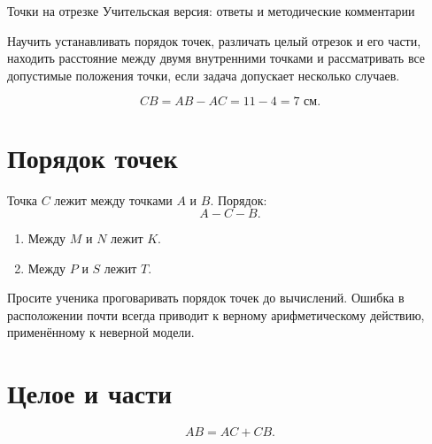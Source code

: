 
\worksheettitle
  {Точки на отрезке}
  {Учительская версия: ответы и методические комментарии}

\begin{teacherbox}
  Научить устанавливать порядок точек, различать целый отрезок и его части,
  находить расстояние между двумя внутренними точками и рассматривать все
  допустимые положения точки, если задача допускает несколько случаев.
\end{teacherbox}

\begin{checkpointbox}
  \[
    CB=AB-AC=11-4=7\text{ см}.
  \]
\end{checkpointbox}

\section{Порядок точек}

\betweenfigure

\begin{propertybox}[Ответ]
  Точка \(C\) лежит между точками \(A\) и \(B\). Порядок:
  \[
    A-C-B.
  \]
\end{propertybox}

\begin{practicebox}
  \begin{enumerate}[label=\alph*),itemsep=0.4em]
    \item Между \(M\) и \(N\) лежит \(K\).
    \item Между \(P\) и \(S\) лежит \(T\).
  \end{enumerate}
\end{practicebox}

\begin{teacherbox}
  Просите ученика проговаривать порядок точек до вычислений. Ошибка в
  расположении почти всегда приводит к верному арифметическому действию,
  применённому к неверной модели.
\end{teacherbox}

\section{Целое и части}

\wholepartsfigure

\begin{propertybox}
  \[
    AB=AC+CB.
  \]
\end{propertybox}

